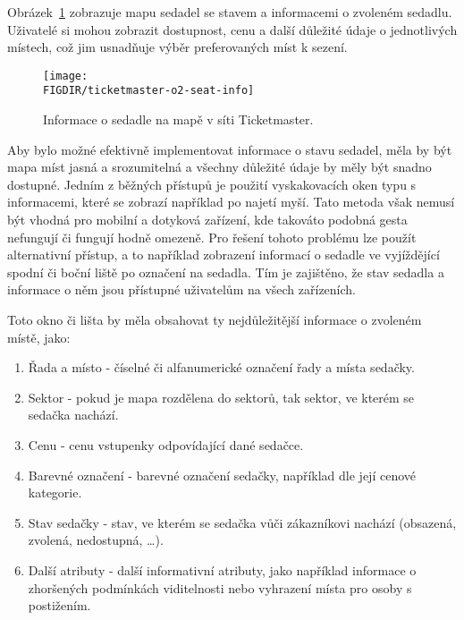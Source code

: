 Obrázek~\ref{fig:ticketmaster-o2-seat-info} zobrazuje mapu sedadel se stavem a informacemi o zvoleném sedadlu.
Uživatelé si mohou zobrazit  dostupnost, cenu a další důležité údaje o jednotlivých místech, což jim usnadňuje výběr preferovaných míst k sezení.

\begin{figure}[H]
    \texttt{[image: \\FIGDIR/ticketmaster-o2-seat-info]}
    \centering
    \caption{Informace o sedadle na mapě v síti Ticketmaster.}
    \label{fig:ticketmaster-o2-seat-info}
\end{figure}

Aby bylo možné efektivně implementovat informace o stavu sedadel, měla by být mapa míst jasná a srozumitelná a všechny důležité údaje by měly být snadno dostupné.
Jedním z běžných přístupů je použití vyskakovacích oken typu  s informacemi, které se zobrazí  například po najetí myší.
Tato metoda však nemusí být vhodná pro mobilní a dotyková zařízení, kde takováto podobná gesta nefungují či fungují hodně omezeně.
Pro řešení tohoto problému lze použít alternativní přístup, a to například zobrazení informací o sedadle ve vyjíždějící spodní či boční liště po označení na sedadla.
Tím je zajištěno, že stav sedadla a informace o něm jsou přístupné uživatelům na všech zařízeních.

Toto okno či lišta by měla obsahovat ty nejdůležitější informace o zvoleném místě, jako:
\begin{enumerate}
    \item Řada a místo - číselné či alfanumerické označení řady a místa sedačky.
    \item Sektor - pokud je mapa rozdělena do sektorů, tak sektor, ve kterém se sedačka nachází.
    \item Cenu - cenu vstupenky odpovídající dané sedačce.
    \item Barevné označení - barevné označení sedačky, například dle její cenové kategorie.
    \item Stav sedačky - stav, ve kterém se sedačka vůči zákazníkovi nachází (obsazená, zvolená, nedostupná, \ldots).
    \item Další atributy - další informativní atributy, jako například informace o zhoršených podmínkách viditelnosti nebo vyhrazení místa pro osoby s postižením.
\end{enumerate}


